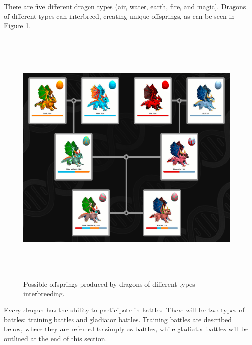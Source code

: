 \documentclass[12pt]{article}
\begin{document}
There are five different dragon types (air, water, earth, fire, and magic). Dragons of different types can interbreed, creating unique offsprings, as can be seen in Figure \ref{fig:Possible_offsprings_produced_by_dragons_of_different_types_interbreeding}.\par



\begin{Center}
\begin{figure}[!ht]
	\begin{Center}		\includegraphics[width=6.27in,height=5.15in]{./media/image16.png}
		\caption{Possible offsprings produced by dragons of different types interbreeding.}
		\label{fig:Possible_offsprings_produced_by_dragons_of_different_types_interbreeding}
	\end{Center}\end{figure}
\end{Center}





Every dragon has the ability to participate in battles. There will be two types of battles: training battles and gladiator battles. Training battles are described below, where they are referred to simply as battles, while gladiator battles will be outlined at the end of this section.\par
\end{document}
